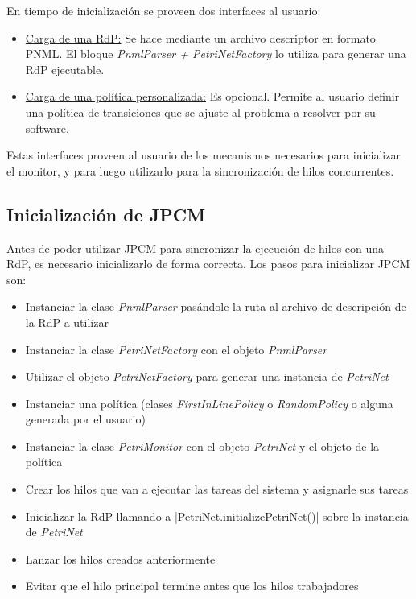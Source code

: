 En tiempo de inicialización se proveen dos interfaces al usuario:
\begin{itemize} 
  \item \underline{Carga de una RdP:} Se hace mediante un archivo descriptor
  en formato PNML. El bloque \textit{PnmlParser + PetriNetFactory} lo utiliza
  para generar una RdP ejecutable.
  \item \underline{Carga de una política personalizada:} Es opcional. Permite
  al usuario definir una política de transiciones que se ajuste al problema a
  resolver por su software.
\end{itemize}

Estas interfaces proveen al usuario de los mecanismos necesarios para
inicializar el monitor, y para luego utilizarlo para la sincronización de hilos
concurrentes.

\subsection{Inicialización de JPCM}
Antes de poder utilizar JPCM para sincronizar la ejecución de hilos con una
RdP, es necesario inicializarlo de forma correcta. Los pasos para inicializar
JPCM son:
\begin{itemize}
  \item Instanciar la clase \textit{PnmlParser} pasándole la ruta al archivo de
  descripción de la RdP a utilizar
  \item Instanciar la clase \textit{PetriNetFactory} con el objeto
  \textit{PnmlParser}
  \item Utilizar el objeto \textit{PetriNetFactory} para generar una instancia
  de \textit{PetriNet}
  \item Instanciar una política (clases \textit{FirstInLinePolicy} o
  \textit{RandomPolicy} o alguna generada por el usuario)
  \item Instanciar la clase \textit{PetriMonitor} con el objeto
  \textit{PetriNet} y el objeto de la política
  \item Crear los hilos que van a ejecutar las tareas del sistema y asignarle
  sus tareas
  \item Inicializar la RdP llamando a |PetriNet.initializePetriNet()|
  sobre la instancia de \textit{PetriNet}
  \item Lanzar los hilos creados anteriormente
  \item Evitar que el hilo principal termine antes que los hilos trabajadores
\end{itemize}
 
